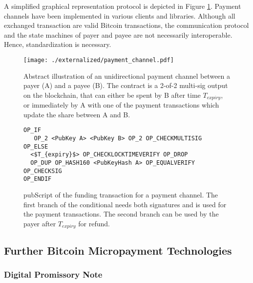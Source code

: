 A simplified graphical representation protocol is depicted in Figure \ref{fig:paymentchannels}. Payment channels have been implemented in various clients and libraries. Although all exchanged transaction are valid Bitcoin transactions, the communication protocol and the state machines of payer and payee are not necessarily interoperable. Hence, standardization is necessary.


\begin{figure}
\centering
\texttt{[image: ./externalized/payment\_channel.pdf]}
\caption{Abstract illustration of an unidirectional payment channel between a payer (A) and a payee (B). The contract is a 2-of-2 multi-sig output on the blockchain, that can either be spent by B after time $T_{expiry}$, or immediately by A with one of the payment transactions which update the share between A and B.}
\label{fig:paymentchannels}
\end{figure}

\begin{figure}
\begin{lstlisting}[breaklines,mathescape=true]
OP_IF
   OP_2 <PubKey A> <PubKey B> OP_2 OP_CHECKMULTISIG
OP_ELSE
  <$T_{expiry}$> OP_CHECKLOCKTIMEVERIFY OP_DROP
  OP_DUP OP_HASH160 <PubKeyHash A> OP_EQUALVERIFY OP_CHECKSIG
OP_ENDIF
\end{lstlisting} 
\caption{pubScript of the funding transaction for a payment channel. The first branch of the conditional needs both signatures and is used for the payment transactions. The second branch can be used by the payer after $T_{expiry}$ for refund.}
\label{fig:pubScriptFunding}
\end{figure}

 \subsection{Further Bitcoin Micropayment Technologies}

 \subsubsection{Digital Promissory Note}

